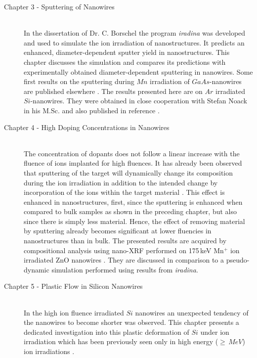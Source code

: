 \begin{description}
  \item[\normalfont Chapter 3 - Sputtering of Nanowires] \hfill \\
  In the dissertation of Dr. C. Borschel \cite{borschel_ion-solid_2012} the program \emph{iradina} \cite{borschel_ion_2011} was developed and used to simulate the ion irradiation of nanostructures. It predicts an enhanced, diameter-dependent sputter yield in nanostructures. This chapter discusses the simulation and compares its predictions with experimentally obtained diameter-dependent sputtering in nanowires. Some first results on the sputtering during $Mn$ irradiation of $GaAs$-nanowires are published elsewhere \cite{johannes_enhanced_2014}. The results presented here are on $Ar$ irradiated $Si$-nanowires. They were obtained in close cooperation with Stefan Noack \cite{noack_sputter_2014} in his M.Sc. and also published in reference \cite{johannes_anomalous_2015}.
  \item[\normalfont Chapter 4 - High Doping Concentrations in Nanowires] \hfill \\
  The concentration of dopants does not follow a linear increase with the fluence of ions implanted for high fluences. It has already been observed that sputtering of the target will dynamically change its composition during the ion irradiation in addition to the intended change by incorporation of the ions within the target material \cite{moller_tridyn_1984,moller_tridyn-binary_1988,miyagawa_computer_1991,sigmund_alloy_1993,eckstein_oscillations_2000}. This effect is enhanced in nanostructures, first, since the sputtering is enhanced when compared to bulk samples as shown in the preceding chapter, but also since there is simply less material. Hence, the effect of removing material by sputtering already becomes significant at lower fluencies in nanostructures than in bulk. The presented results are acquired by compositional analysis using nano-XRF performed on 175\,keV Mn$^+$ ion irradiated ZnO nanowires \cite{johannes_enhanced_2014}. They are discussed in comparison to a pseudo-dynamic simulation performed using results from \emph{iradina}.
  \item[\normalfont Chapter 5 - Plastic Flow in Silicon Nanowires] \hfill \\
  In the high ion fluence irradiated $Si$ nanowires an unexpected tendency of the nanowires to become shorter was observed. This chapter presents a dedicated investigation into this plastic deformation of $Si$ under ion irradiation which has been previously seen only in high energy ($\ge\,MeV$) ion irradiations \cite{volkert_stress_1991,trinkaus_viscoelastic_1995,hedler_amorphous_2004,hedler_boundary_2005}.
\end{description}
